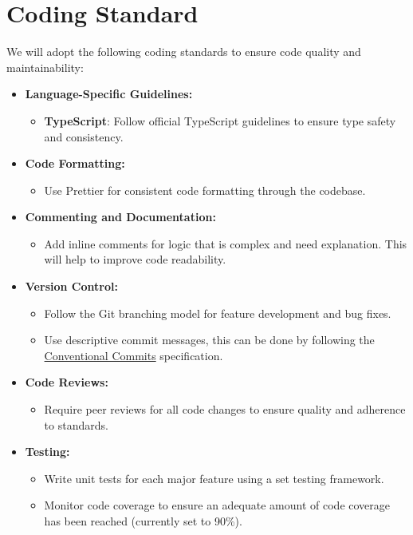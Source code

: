 \documentclass{article}
\begin{document}
\section{Coding Standard}

We will adopt the following coding standards to ensure code quality and maintainability:

\begin{itemize}
    \item \textbf{Language-Specific Guidelines:}
    \begin{itemize}
        \item \textbf{TypeScript}: Follow official TypeScript guidelines to ensure type safety and consistency.
    \end{itemize}

    \item \textbf{Code Formatting:}
    \begin{itemize}
        \item Use Prettier for consistent code formatting through the codebase.
    \end{itemize}

    \item \textbf{Commenting and Documentation:}
    \begin{itemize}
        \item Add inline comments for logic that is complex and need explanation. This will help to improve code readability.
    \end{itemize}

    \item \textbf{Version Control:}
    \begin{itemize}
        \item Follow the Git branching model for feature development and bug fixes.
        \item Use descriptive commit messages, this can be done by following the \href{https://www.conventionalcommits.org/en/v1.0.0/}{Conventional Commits} specification.
    \end{itemize}

    \newpage{}

    \item \textbf{Code Reviews:}
    \begin{itemize}
        \item Require peer reviews for all code changes to ensure quality and adherence to standards.
    \end{itemize}

    \item \textbf{Testing:}
    \begin{itemize}
        \item Write unit tests for each major feature using a set testing framework.
        \item Monitor code coverage to ensure an adequate amount of code coverage has been reached (currently set to 90\%).
    \end{itemize}
\end{itemize}
\end{document}
